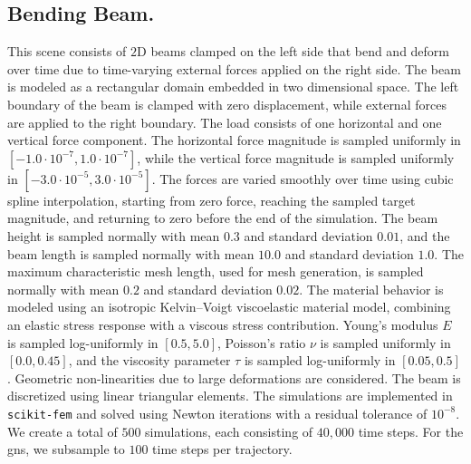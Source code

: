 \subsection{Bending Beam.}
%
%
This scene consists of $2$D beams clamped on the left side that bend and deform over time due to time-varying external forces applied on the right side.
%
The beam is modeled as a rectangular domain embedded in two dimensional space.
%
The left boundary of the beam is clamped with zero displacement, while external forces are applied to the right boundary.
%
The load consists of one horizontal and one vertical force component.
%
The horizontal force magnitude is sampled uniformly in $[-1.0{\cdot}10^{-7}, 1.0{\cdot}10^{-7}]$, while the vertical force magnitude is sampled uniformly in $[-3.0{\cdot}10^{-5}, 3.0{\cdot}10^{-5}]$.
%
The forces are varied smoothly over time using cubic spline interpolation, starting from zero force, reaching the sampled target magnitude, and returning to zero before the end of the simulation.
%
The beam height is sampled normally with mean $0.3$ and standard deviation $0.01$, and the beam length is sampled normally with mean $10.0$ and standard deviation $1.0$.
%
The maximum characteristic mesh length, used for mesh generation, is sampled normally with mean $0.2$ and standard deviation $0.02$.
%
The material behavior is modeled using an isotropic Kelvin--Voigt viscoelastic material model, combining an elastic stress response with a viscous stress contribution.
%
Young's modulus $E$ is sampled log-uniformly in $[0.5, 5.0]$, Poisson's ratio $\nu$ is sampled uniformly in $[0.0, 0.45]$, and the viscosity parameter $\tau$ is sampled log-uniformly in $[0.05, 0.5]$.
%
Geometric non-linearities due to large deformations are considered.
%
The beam is discretized using linear triangular elements.
%
The simulations are implemented in \texttt{scikit-fem} and solved using Newton iterations with a residual tolerance of $10^{-8}$.
%
We create a total of $500$ simulations, each consisting of $40{,}000$ time steps. For the \gls{gns}, we subsample to $100$ time steps per trajectory.
%

